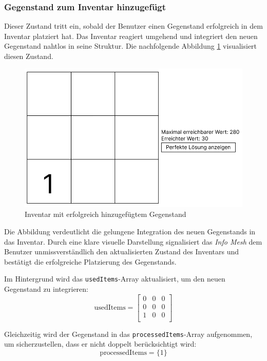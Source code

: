 \subsubsection*{Gegenstand zum Inventar hinzugefügt}
Dieser Zustand tritt ein, sobald der Benutzer einen Gegenstand erfolgreich in dem Inventar platziert hat. Das Inventar
reagiert umgehend und integriert den neuen Gegenstand nahtlos in seine Struktur. Die nachfolgende Abbildung
\ref{fig:controller_itemAdded} visualisiert diesen Zustand.


\begin{figure}[H]
    \centering
    \includegraphics[scale=0.5]{images/itemAdded}
    \caption{Inventar mit erfolgreich hinzugefügtem Gegenstand}
    \label{fig:controller_itemAdded}
\end{figure}

Die Abbildung verdeutlicht die gelungene Integration des neuen Gegenstands in das Inventar. Durch eine klare visuelle
Darstellung signalisiert das \textit{Info Mesh} dem Benutzer unmissverständlich den aktualisierten Zustand des Inventars
und bestätigt die erfolgreiche Platzierung des Gegenstands.

Im Hintergrund wird das \texttt{usedItems}-Array aktualisiert, um den neuen Gegenstand zu integrieren:
\[
\text{usedItems} =
\left[
\begin{array}{ccccc}
0 & 0 & 0 \\
0 & 0 & 0 \\
1 & 0 & 0 \\
\end{array}
\right]
\]

Gleichzeitig wird der Gegenstand in das \texttt{processedItems}-Array aufgenommen, um sicherzustellen, dass er nicht
doppelt berücksichtigt wird:
\[
\text{processedItems} = \{1\}
\]

